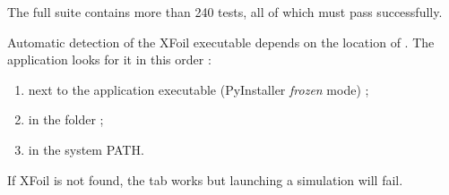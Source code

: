 The full suite contains more than 240 tests, all of which must
pass successfully.

\begin{attention}
Automatic detection of the XFoil executable depends on
the location of . The application looks for it
in this order :
\begin{enumerate}
    \item next to the application executable (PyInstaller
        \emph{frozen} mode) ;
    \item in the  folder ;
    \item in the system PATH.
\end{enumerate}
If XFoil is not found, the  tab
works but launching a simulation will fail.
\end{attention}
